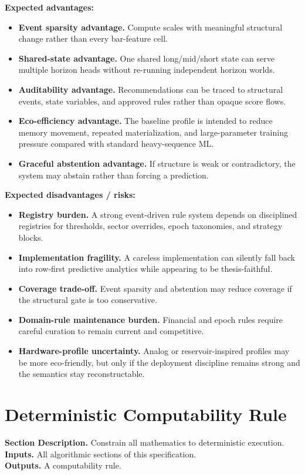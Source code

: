 \documentclass[11pt]{report}
\newcommand{\meta}[3]{\textbf{Section Description.} #1\\
\textbf{Inputs.} #2\\
\textbf{Outputs.} #3\par}
\begin{document}
\textbf{Expected advantages:}
\begin{itemize}
    \item \textbf{Event sparsity advantage.} Compute scales with meaningful structural change rather than every bar-feature cell.
    \item \textbf{Shared-state advantage.} One shared long/mid/short state can serve multiple horizon heads without re-running independent horizon worlds.
    \item \textbf{Auditability advantage.} Recommendations can be traced to structural events, state variables, and approved rules rather than opaque score flows.
    \item \textbf{Eco-efficiency advantage.} The baseline profile is intended to reduce memory movement, repeated materialization, and large-parameter training pressure compared with standard heavy-sequence ML.
    \item \textbf{Graceful abstention advantage.} If structure is weak or contradictory, the system may abstain rather than forcing a prediction.
\end{itemize}

\textbf{Expected disadvantages / risks:}
\begin{itemize}
    \item \textbf{Registry burden.} A strong event-driven rule system depends on disciplined registries for thresholds, sector overrides, epoch taxonomies, and strategy blocks.
    \item \textbf{Implementation fragility.} A careless implementation can silently fall back into row-first predictive analytics while appearing to be thesis-faithful.
    \item \textbf{Coverage trade-off.} Event sparsity and abstention may reduce coverage if the structural gate is too conservative.
    \item \textbf{Domain-rule maintenance burden.} Financial and epoch rules require careful curation to remain current and competitive.
    \item \textbf{Hardware-profile uncertainty.} Analog or reservoir-inspired profiles may be more eco-friendly, but only if the deployment discipline remains strong and the semantics stay reconstructable.
\end{itemize}


\section{Deterministic Computability Rule}
\meta{Constrain all mathematics to deterministic execution.}{All algorithmic sections of this specification.}{A computability rule.}
\end{document}

